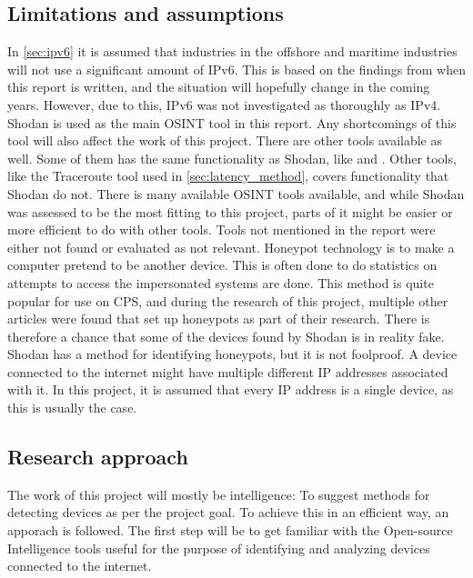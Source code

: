 \subsection{Limitations and assumptions} \label{sec:limits}
In \cref{sec:ipv6} it is assumed that industries in the offshore and maritime industries will not use a significant amount of IPv6. This is based on the findings from when this report is written, and the situation will hopefully change in the coming years. However, due to this, IPv6 was not investigated as thoroughly as IPv4.
Shodan is used as the main OSINT tool in this report. Any shortcomings of this tool will also affect the work of this project.
There are other tools available as well. Some of them has the same functionality as Shodan, like \href{https://censys.io/}{\color{blue}{Censys}}\cite{censys} and \href{www.zoomeye.org}{\color{blue}{ZoomEye}}\cite{zoomeye}. Other tools, like the Traceroute tool used in \cref{sec:latency_method}, covers functionality that Shodan do not. There is many available OSINT tools available, and while Shodan was assessed to be the most fitting to this project, parts of it might be easier or more efficient to do with other tools. Tools not mentioned in the report were either not found or evaluated as not relevant.
Honeypot technology is to make a computer pretend to be another device. This is often done to do statistics on attempts to access the impersonated systems are done. This method is quite popular for use on CPS, and during the research of this project, multiple other articles were found that set up honeypots as part of their research.\cite{bodenheim_butts_dunlap_mullins_2014}\cite{ICS_shodan_article} There is therefore a chance that some of the devices found by Shodan is in reality fake. Shodan has a method for identifying honeypots, but it is not foolproof.
A device connected to the internet might have multiple different IP addresses associated with it. In this project, it is assumed that every IP address is a single device, as this is usually the case.


\subsection{Research approach} \label{sec:research_approach}
The work of this project will mostly be intelligence: To suggest methods for detecting devices as per the project goal. To achieve this in an efficient way, an apporach is followed.
The first step will be to get familiar with the Open-source Intelligence tools useful for the purpose of identifying and analyzing devices connected to the internet. 


